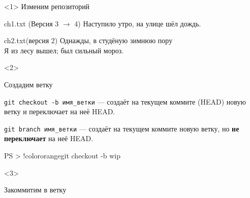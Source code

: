 \documentclass[9pt, aspectratio=1610]{beamer}
\begin{document}
\begin{frame}[t,fragile]
\begin{columns}[onlytextwidth]
\begin{column}[T]{\colA\linewidth}
\begin{tikzpicture}[
				commit/.style = {draw,minimum width=3em,minimum height=1.5em},
				committext/.style = {font=\ttfamily},
				info/.style = {font=\ttfamily\color{FireBrick}\small,align=left},
				]
			\end{tikzpicture}
			
			
		\end{column}
		\begin{column}[T]{\linewidth}
			
			\begin{minipage}[t][5.2cm][t]{\textwidth}		
				
				\begin{onlyenv}<1>
					Изменим репозиторий
					
					\begin{block}{ch1.txt (Версия 3 $\to$ 4)}
						\mbox{} Наступило утро, на улице шёл дождь.
					\end{block}
					
					\begin{block}{ch2.txt(версия 2)}
						Однажды, в студёную зимнюю пору\\ 
						Я из лесу вышел; был сильный мороз.
					\end{block}
				\end{onlyenv}
				
				\begin{onlyenv}<2>					
					
					Создадим ветку
					
					\begin{alertblock}{\Verb|git checkout -b имя_ветки| ---}
						создаёт на текущем коммите (HEAD) новую ветку и переключает на неё HEAD.
					\end{alertblock}
					
					\begin{alertblock}{\Verb|git branch имя_ветки| ---}
						создаёт на текущем коммите новую ветку, но \textbf{не переключает} на неё HEAD.
					\end{alertblock}\smallskip
					
					\begin{VerbatimCmd}[gobble=6]
						
						PS > !color{orange}git checkout -b wip
						
					\end{VerbatimCmd}
					
				\end{onlyenv}
				
				\begin{onlyenv}<3>					
					
					Закоммитим в ветку
					
					
					\begin{VerbatimCmd}[gobble=6]
						

\end{VerbatimCmd}
\end{onlyenv}
\end{minipage}
\end{column}
\end{columns}
\end{frame}
\end{document}
